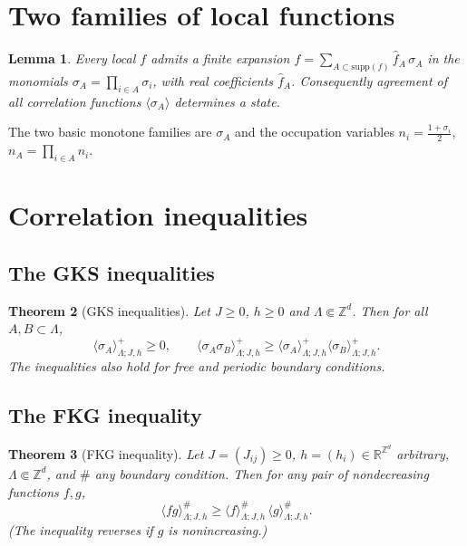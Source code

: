 \documentclass[11pt]{article}
\theoremstyle{plain}
\newtheorem{theorem}{Theorem}
\newtheorem{lemma}[theorem]{Lemma}
\theoremstyle{definition}
\theoremstyle{remark}
\newcommand{\Z}{\mathbb{Z}}
\newcommand{\R}{\mathbb{R}}
\newcommand{\fin}{\Subset}          %
\newcommand{\La}{\Lambda}
\newcommand{\sg}{\sigma}
\newcommand{\bdy}{\#}
\newcommand{\avg}[1]{\langle #1 \rangle}
\newcommand{\meanp}[1]{\langle #1 \rangle^{+}}
\begin{document}
\section{Two families of local functions}
\setcounter{theorem}{18}%
\begin{lemma}
Every local $f$ admits a finite expansion
$f=\sum_{A\subset\mathrm{supp}(f)} \hat f_A\,\sg_A$ in the monomials
$\sg_A=\prod_{i\in A}\sg_i$, with real coefficients $\hat f_A$. Consequently
agreement of all correlation functions $\avg{\sg_A}$ determines a state.
\end{lemma}
\noindent The two basic monotone families are $\sg_A$ and the occupation
variables $n_i=\tfrac{1+\sg_i}{2}$, $n_A=\prod_{i\in A} n_i$.

\section{Correlation inequalities}

\subsection{The GKS inequalities}
\begin{theorem}[GKS inequalities]
Let $J\ge0$, $h\ge0$ and $\La\fin\Z^d$. Then for all $A,B\subset\La$,
\[
  \meanp{\sg_A}_{\La;J,h}\ge0,\qquad
  \meanp{\sg_A\sg_B}_{\La;J,h}
     \ge \meanp{\sg_A}_{\La;J,h}\meanp{\sg_B}_{\La;J,h}. \tag{3.21--3.22}
\]
The inequalities also hold for free and periodic boundary conditions.
\end{theorem}

\subsection{The FKG inequality}
\begin{theorem}[FKG inequality]
Let $J=(J_{ij})\ge0$, $h=(h_i)\in\R^{\Z^d}$ arbitrary, $\La\fin\Z^d$, and
$\bdy$ any boundary condition. Then for any pair of nondecreasing functions
$f,g$,
\[
  \avg{fg}^{\bdy}_{\La;J,h}
    \ge \avg{f}^{\bdy}_{\La;J,h}\,\avg{g}^{\bdy}_{\La;J,h}. \tag{3.24}
\]
(The inequality reverses if $g$ is nonincreasing.)
\end{theorem}
\end{document}
